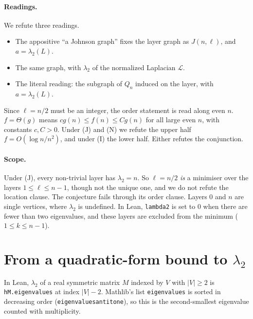 \documentclass[11pt]{article}
\theoremstyle{definition}
\theoremstyle{remark}
\renewcommand{\_}{\oldus\allowbreak}
\begin{document}
\paragraph{Readings.} We refute three readings.
\begin{itemize}[leftmargin=*]
\item[(J)] The appositive ``a Johnson graph'' fixes the layer graph as $J(n,\ell)$, and $a=\lambda_2(L)$.
\item[(N)] The same graph, with $\lambda_2$ of the normalized Laplacian $\mathcal L$.
\item[(I)] The literal reading: the subgraph of $Q_n$ induced on the layer, with $a=\lambda_2(L)$.
\end{itemize}
Since $\ell=n/2$ must be an integer, the order statement is read along even $n$. $f=\Theta(g)$ means
$cg(n)\le f(n)\le Cg(n)$ for all large even $n$, with constants $c,C>0$. Under (J) and (N) we refute
the upper half $f=O(\log n/n^2)$, and under (I) the lower half. Either refutes the conjunction.

\paragraph{Scope.} Under (J), every non-trivial layer has $\lambda_2=n$. So $\ell=n/2$ \emph{is} a
minimiser over the layers $1\le\ell\le n-1$, though not the unique one, and we do not refute the
location clause. The conjecture fails through its order clause. Layers $0$ and $n$ are single
vertices, where $\lambda_2$ is undefined. In Lean, \texttt{lambda2} is set to $0$ when there are fewer
than two eigenvalues, and these layers are excluded from the minimum ($1\le k\le n-1$).

\section{From a quadratic-form bound to $\lambda_2$}

In Lean, $\lambda_2$ of a real symmetric matrix $M$ indexed by $V$ with $|V|\ge2$ is
\texttt{hM.eigenvalues\_0} at index $|V|-2$. Mathlib's list \texttt{eigenvalues\_0} is sorted in
decreasing order (\texttt{eigenvalues\_0\_antitone}), so this is the second-smallest eigenvalue counted
with multiplicity.
\end{document}
